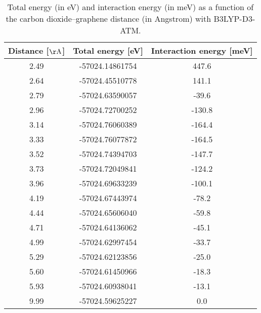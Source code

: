 \begin{table}[h]
\centering
\begin{tabular}{ccc}
\hline
Distance [$\mathrm{\AA}$] & Total energy [eV] & Interaction energy [meV] \\
\hline
2.49 & -57024.14861754 & 447.6 \\
2.64 & -57024.45510778 & 141.1 \\
2.79 & -57024.63590057 & -39.6 \\
2.96 & -57024.72700252 & -130.8 \\
3.14 & -57024.76060389 & -164.4 \\
3.33 & -57024.76077872 & -164.5 \\
3.52 & -57024.74394703 & -147.7 \\
3.73 & -57024.72049841 & -124.2 \\
3.96 & -57024.69633239 & -100.1 \\
4.19 & -57024.67443974 & -78.2 \\
4.44 & -57024.65606040 & -59.8 \\
4.71 & -57024.64136062 & -45.1 \\
4.99 & -57024.62997454 & -33.7 \\
5.29 & -57024.62123856 & -25.0 \\
5.60 & -57024.61450966 & -18.3 \\
5.93 & -57024.60938041 & -13.1 \\
9.99 & -57024.59625227 & 0.0 \\
\hline
\end{tabular}
\caption{Total energy (in eV) and interaction energy (in meV) as a function of the carbon dioxide--graphene distance (in Angstrom) with B3LYP-D3-ATM.}
\label{SI_dft_table_B3LYP-D3-ATM}
\end{table}
